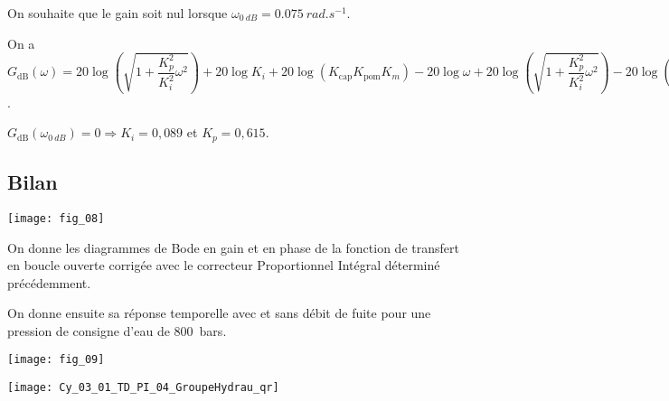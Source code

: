 
\ifprof
\begin{corrige}
On souhaite que le gain soit nul lorsque $\omega_{\SI{0}{dB}}=\SI{0,075}{rad.s^{-1}}$. 

On a $G_{\text{dB}}(\omega)=20\log\left(\sqrt{1+\dfrac{K_p^2}{K_i^2}\omega^2} \right) + 20\log K_i +20\log\left( K_{\text{cap}}K_{\text{pom}}K_m\right)-20\log\omega +20\log\left(\sqrt{1+\dfrac{K_p^2}{K_i^2}\omega^2} \right)
-20\log\left(\sqrt{1+T_1^2\omega^2} \right)
-20\log\left(\sqrt{1+T_2^2\omega^2} \right)$. 

$G_{\text{dB}}\left(\omega_{\SI{0}{dB}}\right) =0 \Rightarrow K_i = 0,089$ et $K_p=0,615$.


\end{corrige}
\else
\fi

\subsection*{Bilan}

\begin{marginfigure}
\texttt{[image: fig\_08]}
\end{marginfigure}

On donne les diagrammes de Bode en gain et en phase de la fonction de transfert en boucle ouverte corrigée avec le correcteur Proportionnel Intégral déterminé précédemment.




On donne ensuite sa réponse temporelle avec et sans débit de fuite pour une pression de consigne d’eau de \SI{800}{bars}.


\begin{marginfigure}
\texttt{[image: fig\_09]}
\end{marginfigure}

\ifprof
\begin{corrige}

\end{corrige}
\else
\fi

\ifprof
\else
\begin{marginfigure}
\centering
\texttt{[image: Cy\_03\_01\_TD\_PI\_04\_GroupeHydrau\_qr]}
\end{marginfigure}
\fi
